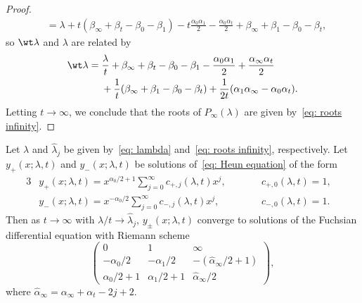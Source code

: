 \begin{proof}
\begin{align*}
 &{}=\lambda+t(\beta_\infty+\beta_t-\beta_0-\beta_1)-t\frac{\alpha_0\alpha_1}{2}
 -\frac{\alpha_0\alpha_t}{2}+\beta_\infty+\beta_1-\beta_0-\beta_t, \end{align*}
 so $\wt\lambda$ and $\lambda$ are related by
 {\allowdisplaybreaks
 \begin{align*}
 \wt\lambda={}&\frac\lambda t+\beta_\infty+\beta_t-\beta_0-\beta_1
 -\frac{\alpha_0\alpha_1}2+\frac{\alpha_\infty\alpha_t}2 \\
 &{}+\frac1t(\beta_\infty+\beta_1-\beta_0-\beta_t)
 +\frac1{2t}(\alpha_1\alpha_\infty-\alpha_0\alpha_t).
 \end{align*}
 }%
 Letting $t\to\infty$, we conclude that the roots of
 $P_\infty(\lambda)$ are given by~\eqref{eq: roots infinity}.
\end{proof}

\begin{Corollary}
 \label{corollary: limiting equations}
 Let $\lambda$ and $\hat\lambda_j$ be given by~\eqref{eq: lambda} and~\eqref{eq: roots infinity}, respectively.
 Let $y_+(x;\lambda,t)$ and $y_-(x;\lambda,t)$ be solutions of~\eqref{eq: Heun equation} of the form
\begin{alignat*}{3}
 & y_+(x;\lambda,t)=x^{\alpha_0/2+1}\sum_{j=0}^\infty
 c_{+,j}(\lambda,t)x^j, \qquad && c_{+,0}(\lambda,t)=1,&
\\
 & y_-(x;\lambda,t)=x^{-\alpha_0/2}\sum_{j=0}^\infty
 c_{-,j}(\lambda,t)x^j, \qquad && c_{-,0}(\lambda,t)=1.&
\end{alignat*}
 Then as $t\to\infty$ with $\lambda/t\to\hat\lambda_j$,
 $y_\pm(x;\lambda,t)$ converge to solutions of the Fuchsian
 differential equation with Riemann scheme
 \begin{equation} \label{eq: RS infinity}
 \begin{pmatrix}
 0 & 1 & \infty \\
 -\alpha_0/2 & -\alpha_1/2 & -(\hat\alpha_\infty/2+1) \\
 \alpha_0/2+1 & \alpha_1/2+1 & \hat\alpha_\infty/2
 \end{pmatrix},
 \end{equation}
 where $\hat\alpha_\infty=\alpha_\infty+\alpha_t-2j+2$.
\end{Corollary}

